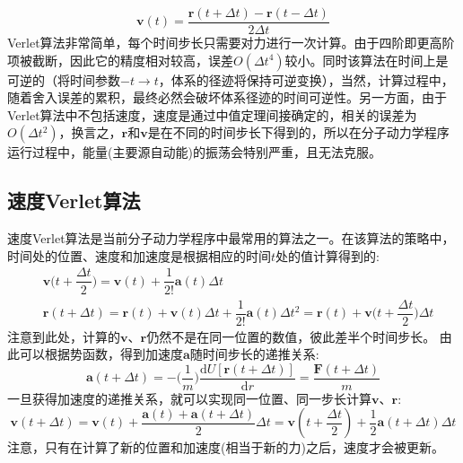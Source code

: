 \begin{equation}
	\mathbf{v}(t)=\dfrac{\mathbf{r}(t+\Delta t)-\mathbf{r}(t-\Delta t)}{2\Delta t}
	\label{eq:Verlet_V}
\end{equation}
\textrm{Verlet}算法非常简单，每个时间步长只需要对力进行一次计算。由于四阶即更高阶项被截断，因此它的精度相对较高，误差$O(\Delta t^4)$较小。同时该算法在时间上是可逆的（将时间参数$-t\rightarrow t$，体系的径迹将保持可逆变换），当然，计算过程中，随着舍入误差的累积，最终必然会破坏体系径迹的时间可逆性。另一方面，由于\textrm{Verlet}算法中不包括速度，速度是通过中值定理间接确定的，相关的误差为$O(\Delta t^2)$，换言之，$\mathbf{r}$和$\mathbf{v}$是在不同的时间步长下得到的，所以在分子动力学程序运行过程中，能量(主要源自动能)的振荡会特别严重，且无法克服。
\subsection{速度{\rm Verlet}算法}
速度\textrm{Verlet}算法\cite{PR165-201_1968}是当前分子动力学程序中最常用的算法之一。在该算法的策略中，时间处的位置、速度和加速度是根据相应的时间$t$处的值计算得到的:
\begin{equation}
	\begin{aligned}
		&\mathbf{v}\bigg(t+\dfrac{\Delta t}2\bigg)=\mathbf{v}(t)+\dfrac1{2!}\mathbf{a}(t)\Delta t\\
		&\mathbf{r}(t+\Delta t)=\mathbf{r}(t)+\mathbf{v}(t)\Delta t+\dfrac1{2!}\mathbf{a}(t)\Delta t^2=\mathbf{r}(t)+\mathbf{v}\bigg(t+\dfrac{\Delta t}2\bigg)\Delta t 
	\end{aligned}
	\label{eq:Verlet_Velocity}
\end{equation}
注意到此处，计算的$\mathbf{v}$、$\mathbf{r}$仍然不是在同一位置的数值，彼此差半个时间步长。
由此可以根据势函数，得到加速度$\mathbf{a}$随时间步长的递推关系:
\begin{equation}
	\mathbf{a}(t+\Delta t)=-\bigg(\dfrac1m\bigg)\dfrac{\mathrm{d}U[\mathbf{r}(t+\Delta t)]}{\mathrm{d}r}=\dfrac{\mathbf{F}(t+\Delta t)}m 
	\label{eq:Verlet_Velocity_a}
\end{equation} 
一旦获得加速度的递推关系，就可以实现同一位置、同一步长计算$\mathbf{v}$、$\mathbf{r}$:
\begin{equation}
	\mathbf{v}(t+\Delta t)=\mathbf{v}(t)+\dfrac{\mathbf{a}(t)+\mathbf{a}(t+\Delta t)}2\Delta t=\mathbf{v}(t+\dfrac{\Delta t}2)+\dfrac12\mathbf{a}(t+\Delta t)\Delta t 
	\label{eq:Verlet_Velocity_2}
\end{equation}
注意，只有在计算了新的位置和加速度(相当于新的力)之后，速度才会被更新。


